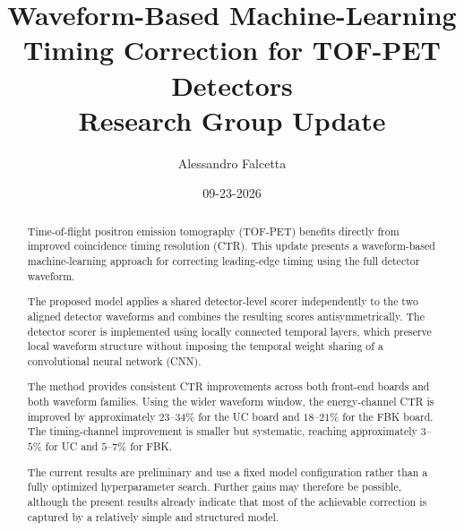 \documentclass[10pt,a4paper,twocolumn]{article}
\title{\textbf{Waveform-Based Machine-Learning Timing Correction for TOF-PET Detectors}\\
\large Research Group Update}
\author{Alessandro Falcetta}
\date{09-23-2026}
\begin{document}
\maketitle
\begin{abstract}

Time-of-flight positron emission tomography (TOF-PET) benefits directly from improved coincidence timing resolution (CTR). 
This update presents a waveform-based machine-learning approach for correcting leading-edge timing using the full detector waveform.

The proposed model applies a shared detector-level scorer independently to the two aligned detector waveforms and combines the resulting scores 
antisymmetrically. The detector scorer is implemented using locally connected temporal layers, which preserve local waveform structure without imposing 
the temporal weight sharing of a convolutional neural network (CNN).

The method provides consistent CTR improvements across both front-end boards and both waveform families. Using the wider waveform window, 
the energy-channel CTR is improved by approximately \(23\)--\(34\%\) for the UC board and \(18\)--\(21\%\) for the FBK board. 
The timing-channel improvement is smaller but systematic, reaching approximately \(3\)--\(5\%\) for UC and \(5\)--\(7\%\) for FBK.

The current results are preliminary and use a fixed model configuration rather than a fully optimized hyperparameter search. 
Further gains may therefore be possible, although the present results already indicate that most of the achievable correction is captured by 
a relatively simple and structured model.

\end{abstract}











\end{document}

